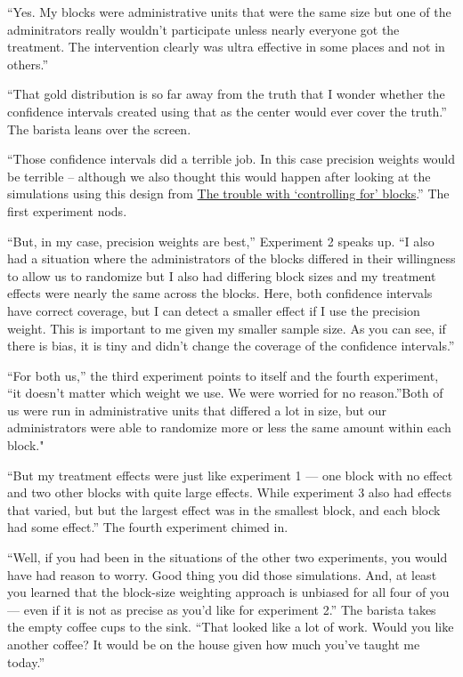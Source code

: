\documentclass[
]{article}
\begin{document}
``Yes. My blocks were administrative units that were the same size but one of
the adminitrators really wouldn't participate unless nearly everyone got the
treatment. The intervention clearly was ultra effective in some places and not
in others.''

``That gold distribution is so far away from the truth that I wonder whether the
confidence intervals created using that as the center would ever cover the
truth.'' The barista leans over the screen.

``Those confidence intervals did a terrible job. In this case precision weights
would be terrible -- although we also thought this would happen after looking
at the simulations using this design from \href{https://declaredesign.org/blog/biased-fixed-effects.html}{The trouble with `controlling for'
blocks}.'' The first
experiment nods.

``But, in my case, precision weights are best,'' Experiment 2 speaks up. ``I also
had a situation where the administrators of the blocks differed in their
willingness to allow us to randomize but I also had differing block sizes and
my treatment effects were nearly the same across the blocks. Here, both
confidence intervals have correct coverage, but I can detect a smaller effect
if I use the precision weight. This is important to me given my smaller sample
size. As you can see, if there is bias, it is tiny and didn't change the
coverage of the confidence intervals.''

``For both us,'' the third experiment points to itself and the fourth experiment,
``it doesn't matter which weight we use. We were worried for no reason.''Both of
us were run in administrative units that differed a lot in size, but our
administrators were able to randomize more or less the same amount within each
block."

``But my treatment effects were just like experiment 1 --- one block with no
effect and two other blocks with quite large effects. While experiment 3 also
had effects that varied, but but the largest effect was in the smallest block,
and each block had some effect.'' The fourth experiment chimed in.

``Well, if you had been in the situations of the other two experiments, you
would have had reason to worry. Good thing you did those simulations. And, at
least you learned that the block-size weighting approach is unbiased for all
four of you --- even if it is not as precise as you'd like for experiment 2.''
The barista takes the empty coffee cups to the sink. ``That looked like a lot
of work. Would you like another coffee? It would be on the house given how much
you've taught me today.''
\end{document}
